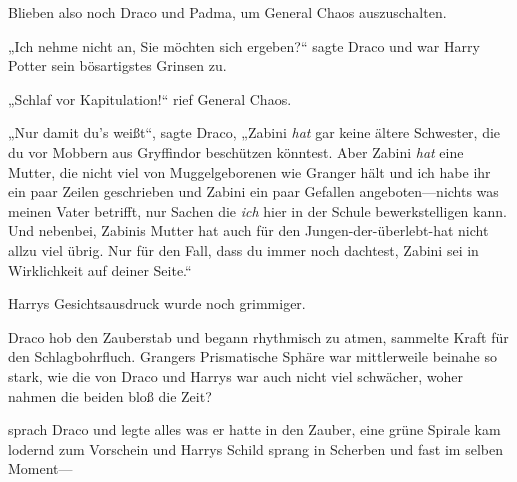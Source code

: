 Blieben also noch Draco und Padma, um General Chaos auszuschalten.

„Ich nehme nicht an, Sie möchten sich ergeben?“ sagte Draco und war Harry Potter sein bösartigstes Grinsen zu.

„Schlaf vor Kapitulation!“ rief General Chaos.

„Nur damit du’s weißt“, sagte Draco, „Zabini \emph{hat} gar keine ältere Schwester, die du vor Mobbern aus Gryffindor beschützen könntest. Aber Zabini \emph{hat} eine Mutter, die nicht viel von Muggelgeborenen wie Granger hält und ich habe ihr ein paar Zeilen geschrieben und Zabini ein paar Gefallen angeboten—nichts was meinen Vater betrifft, nur Sachen die \emph{ich} hier in der Schule bewerkstelligen kann. Und nebenbei, Zabinis Mutter hat auch für den Jungen-der-überlebt-hat nicht allzu viel übrig. Nur für den Fall, dass du immer noch dachtest, Zabini sei in Wirklichkeit auf deiner Seite.“

Harrys Gesichtsausdruck wurde noch grimmiger.

Draco hob den Zauberstab und begann rhythmisch zu atmen, sammelte Kraft für den Schlagbohrfluch. Grangers Prismatische Sphäre war mittlerweile beinahe so stark, wie die von Draco und Harrys war auch nicht viel schwächer, woher nahmen die beiden bloß die Zeit?

 sprach Draco und legte alles was er hatte in den Zauber, eine grüne Spirale kam lodernd zum Vorschein und Harrys Schild sprang in Scherben und fast im selben Moment—

